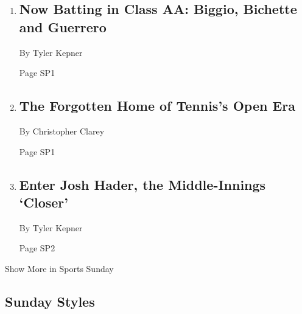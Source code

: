 \begin{enumerate}
\def\labelenumi{\arabic{enumi}.}
\item
  \href{/2018/04/20/sports/baseball/minor-leagues.html}{}

  \hypertarget{now-batting-in-class-aa-biggio-bichette-and-guerrero-1}{%
  \subsection{Now Batting in Class AA: Biggio, Bichette and
  Guerrero}\label{now-batting-in-class-aa-biggio-bichette-and-guerrero-1}}

  By Tyler Kepner

  Page SP1
\item
  \href{/2018/04/22/sports/tennis/british-hard-court-championships.html}{}

  \hypertarget{the-forgotten-home-of-tenniss-open-era}{%
  \subsection{The Forgotten Home of Tennis's Open
  Era}\label{the-forgotten-home-of-tenniss-open-era}}

  By Christopher Clarey

  Page SP1
\item
  \href{/2018/04/21/sports/baseball/relievers-josh-hader.html}{}

  \hypertarget{enter-josh-hader-the-middle-innings-closer}{%
  \subsection{Enter Josh Hader, the Middle-Innings
  `Closer'}\label{enter-josh-hader-the-middle-innings-closer}}

  By Tyler Kepner

  Page SP2
\end{enumerate}

Show More in Sports Sunday

\hypertarget{sunday-styles}{%
\subsection{Sunday Styles}\label{sunday-styles}}

